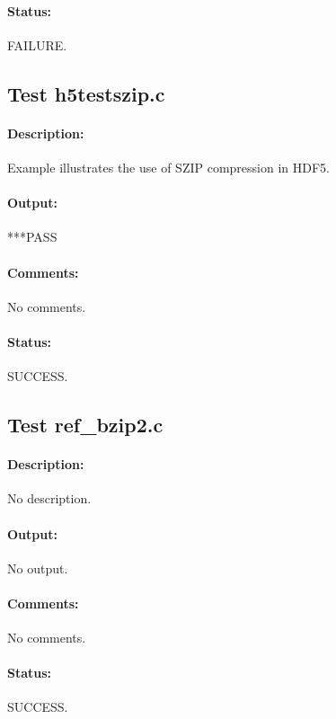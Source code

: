\paragraph{Status:} FAILURE.

\subsection{Test h5testszip.c}

\paragraph{Description:} Example illustrates the use of SZIP compression in HDF5.

\paragraph{Output:} ***PASS

\paragraph{Comments:} No comments.

\paragraph{Status:} SUCCESS.

\subsection{Test ref\_bzip2.c}

\paragraph{Description:} No description.

\paragraph{Output:} No output.

\paragraph{Comments:} No comments.

\paragraph{Status:} SUCCESS.

